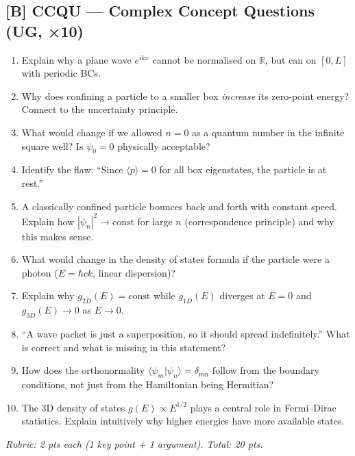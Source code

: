 \subsection*{[B] CCQU — Complex Concept Questions (UG, ×10)}
\begin{tcolorbox}[ugconceptbox, title={CCQU · L01 · Tiers 2–3 · 25–35 min}]
\begin{enumerate}[label=\textbf{Q\arabic*.}]
  \item Explain why a plane wave $e^{ikx}$ cannot be normalised on $\mathbb{R}$, but can on $[0,L]$ with periodic BCs.
  \item Why does confining a particle to a smaller box \emph{increase} its zero-point energy? Connect to the uncertainty principle.
  \item What would change if we allowed $n=0$ as a quantum number in the infinite square well? Is $\psi_0 = 0$ physically acceptable?
  \item Identify the flaw: ``Since $\langle p \rangle = 0$ for all box eigenstates, the particle is at rest.''
  \item A classically confined particle bounces back and forth with constant speed. Explain how $|\psi_n|^2 \to \mathrm{const}$ for large $n$ (correspondence principle) and why this makes sense.
  \item What would change in the density of states formula if the particle were a photon ($E = \hbar ck$, linear dispersion)?
  \item Explain why $g_{2D}(E) = \mathrm{const}$ while $g_{1D}(E)$ diverges at $E=0$ and $g_{3D}(E) \to 0$ as $E\to0$.
  \item ``A wave packet is just a superposition, so it should spread indefinitely.'' What is correct and what is missing in this statement?
  \item How does the orthonormality $\langle\psi_m|\psi_n\rangle = \delta_{mn}$ follow from the boundary conditions, not just from the Hamiltonian being Hermitian?
  \item The 3D density of states $g(E) \propto E^{1/2}$ plays a central role in Fermi–Dirac statistics. Explain intuitively why higher energies have more available states.
\end{enumerate}
\textit{Rubric: 2 pts each (1 key point + 1 argument). Total: 20 pts.}
\end{tcolorbox}

